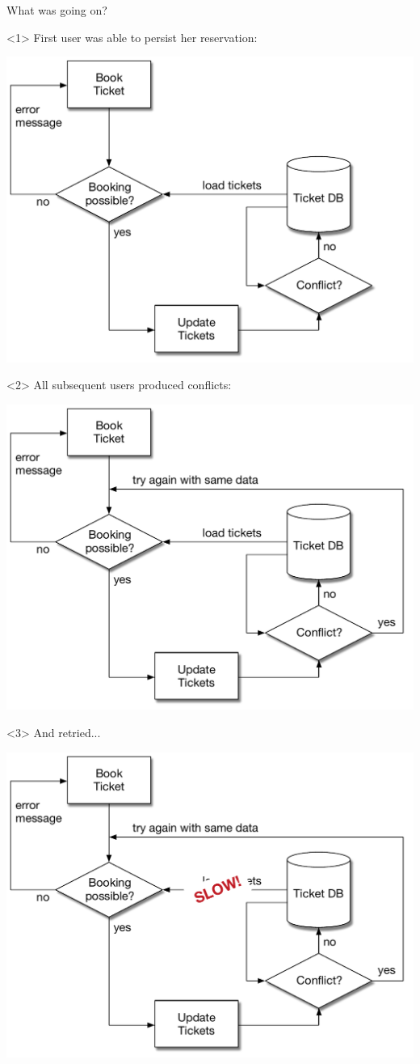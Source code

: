 \begin{frame}[fragile]{What was going on?}

\renewcommand{\SPACE}{1em}

\begin{center}

\begin{onlyenv}<1>
First user was able to persist her reservation:
\vspace{\SPACE}

\includegraphics[width=.6\textwidth]{../OptimisticLocking6.pdf}
\end{onlyenv}

\begin{onlyenv}<2>
All subsequent users produced conflicts: 
\vspace{\SPACE}

\includegraphics[width=.6\textwidth]{../OptimisticLocking7.pdf}
\end{onlyenv}

\begin{onlyenv}<3>
And retried...
\vspace{\SPACE}

\includegraphics[width=.6\textwidth]{../OptimisticLocking8.pdf}
\end{onlyenv}


\end{center}
\end{frame}
